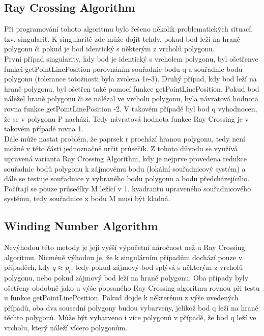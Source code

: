\documentclass[a4paper,11pt,twoside]{article}
\begin{document}
\subsection{Ray Crossing Algorithm}
\large
Při programování tohoto algoritmu bylo řešeno několik problematických situací, tzv. singularit. K singularitě zde může dojít tehdy, pokud bod leží na hraně polygonu či pokud je bod identický s některým z vrcholů polygonu. \\
\indent První případ singularity, kdy bod je identický s vrcholem polygonu, byl ošetřenve funkci getPointLinePosition porovnáním souřadnic bodu q a souřadnic bodu polygonu (tolerance totožnosti byla zvolena 1e-3). Druhý případ, kdy bod leží na hraně polygonu, byl ošetřen také pomocí funkce getPointLinePosition. Pokud bod náležel hraně polygonu či se nalézal ve vrcholu polygonu, byla návratová hodnota rovna funkce getPointLinePosition -2. V takovém případě byl bod q vyhodnocen, že se v polygonu P nachází. Tedy návratová hodnota funkce Ray Crossing je v takovém případě rovna 1.\\
\indent Dále může nastat problém, že paprsek r prochází hranou polygonu, tedy není možné v této části jednoznačně určit průsečík. Z tohoto důvodu se využívá upravená varianta Ray Crossing Algorithm, kdy je nejprve provedena redukce souřadnic bodů polygonu k zájmovému bodu (lokální souřadnicový systém) a dále se testuje souřadnice y vybraného bodu polygonu a bodu předcházejícího. Počítají se pouze průsečíky M ležící v 1. kvadrantu upraveného souřadnicového systému, tedy souřadnice x bodu M musí být kladná.

\subsection{Winding Number Algorithm}
\large
Nevýhodou této metody je její vyšší výpočetní náročnost než u Ray Crossing algoritmu. Nicméně výhodou je, že k singulárním případům dochází pouze v případěch, kdy $q \approx p_i$, tedy pokud zájmový bod splývá s některým z vrcholů polygonu, nebo pokud zájmový bod leží na hraně polygonu. Oba případy byly ošetřeny obdobně jako u výše popsaného Ray Crossing algoritmu rovnou při testu u funkce getPointLinePosition. Pokud dojde k některému z výše uvedených případů, oba dva sousední polygony budou vybarveny, jelikož bod q leží na hraně těchto polygonů. Může být vybarveno i více polygonů v případě, že bod q leží ve vrcholu, který náleží vícero polygonům.

\newpage
{}
\end{document}
